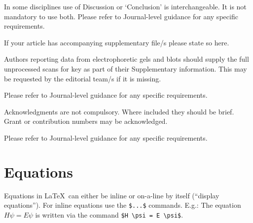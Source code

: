 \documentclass[pdflatex,sn-mathphys]{sn-jnl}%
\theoremstyle{thmstyleone}%
\theoremstyle{thmstyletwo}%
\theoremstyle{thmstylethree}%
\begin{document}
In some disciplines use of Discussion or `Conclusion' is interchangeable.
It is not mandatory to use both.
Please refer to Journal-level guidance for any specific requirements.

\backmatter


If your article has accompanying supplementary file/s please state so here. 

Authors reporting data from electrophoretic gels and blots should supply the full unprocessed scans for key as part of their Supplementary information.
This may be requested by the editorial team/s if it is missing.

Please refer to Journal-level guidance for any specific requirements.


Acknowledgments are not compulsory.
Where included they should be brief.
Grant or contribution numbers may be acknowledged.

Please refer to Journal-level guidance for any specific requirements.



\section{Equations}
\label{sec:equations}

Equations in \LaTeX\ can either be inline or on-a-line by itself (``display equations'').
For inline equations use the \verb+$...$+ commands.
E.g.: The equation $H\psi = E \psi$ is written via the command \verb+$H \psi = E \psi$+.
\end{document}
